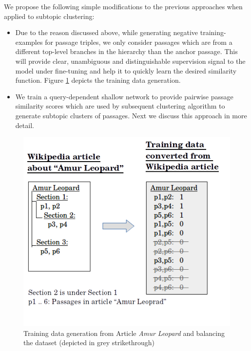 We propose the following simple modifications to the previous approaches when applied to subtopic clustering:
\begin{itemize}
    \item Due to the reason discussed above, while generating negative  training-examples for passage triples, we only consider passages which are from a different top-level branches in the hierarchy than the anchor passage. This will provide clear, unambiguous and distinguishable supervision signal to the model under fine-tuning and help it to quickly learn the desired similarity function. Figure \ref{fig:conv} depicts the training data generation.
    \item We train a query-dependent shallow network to provide pairwise passage similarity scores which are used by subsequent clustering algorithm to generate subtopic clusters of passages. Next we discuss this approach in more detail.
\end{itemize}{}
\begin{figure}[h]
  \centering
  \includegraphics[width=\linewidth]{graphics/car_y1_conv.png}
  \caption{Training data generation from Article \textit{Amur Leopard} and balancing the dataset (depicted in grey strikethrough)}
  \label{fig:conv}
\end{figure}

